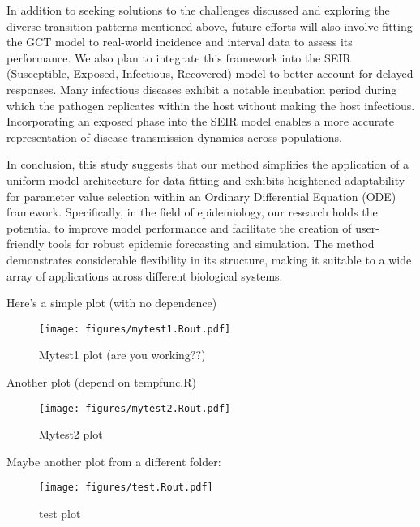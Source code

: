 \documentclass[12pt]{article}
\begin{document}
In addition to seeking solutions to the challenges discussed and exploring the diverse transition patterns mentioned above, future efforts will also involve fitting the GCT model to real-world incidence and interval data to assess its performance. We also plan to integrate this framework into the SEIR (Susceptible, Exposed, Infectious, Recovered) model to better account for delayed responses. Many infectious diseases exhibit a notable incubation period during which the pathogen replicates within the host without making the host infectious. Incorporating an exposed phase into the SEIR model enables a more accurate representation of disease transmission dynamics across populations.

In conclusion, this study suggests that our method simplifies the application of a uniform model architecture for data fitting and exhibits heightened adaptability for parameter value selection within an Ordinary Differential Equation (ODE) framework. Specifically, in the field of epidemiology, our research holds the potential to improve model performance and facilitate the creation of user-friendly tools for robust epidemic forecasting and simulation. The method demonstrates considerable flexibility in its structure, making it suitable to a wide array of applications across different biological systems. 





Here's a simple plot (with no dependence)

\begin{figure}[h!]
    \centering
    \texttt{[image: figures/mytest1.Rout.pdf]}
    \caption{Mytest1 plot (are you working??)}
\end{figure}


Another plot (depend on tempfunc.R)

\begin{figure}[h]
    \centering
    \texttt{[image: figures/mytest2.Rout.pdf]}
    \caption{Mytest2 plot}
\end{figure}

Maybe another plot from a different folder:

\begin{figure}[h]
    \centering
    \texttt{[image: figures/test.Rout.pdf]}
    \caption{test plot}
\end{figure}






 
\end{document}

